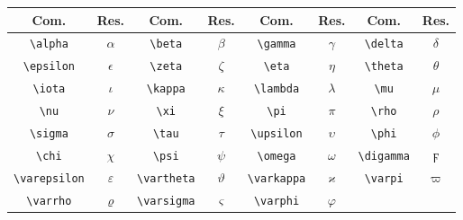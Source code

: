 % 
% 
% 
% 
% 
\begin{tabular}{cc|cc|cc|cc}
    \hline
    Com. & Res. & Com. & Res. & Com. & Res. & Com. & Res. \\ \hline
    \lstinline!\alpha! & $\alpha$ & \lstinline!\beta! & $\beta$ & \lstinline!\gamma! & $\gamma$ & \lstinline!\delta! & $\delta$ \\
    \lstinline!\epsilon! & $\epsilon$ & \lstinline!\zeta! & $\zeta$ & \lstinline!\eta! & $\eta$ & \lstinline!\theta! & $\theta$ \\
    \lstinline!\iota! & $\iota$ & \lstinline!\kappa! & $\kappa$ & \lstinline!\lambda! & $\lambda$ & \lstinline!\mu! & $\mu$ \\
    \lstinline!\nu! & $\nu$ & \lstinline!\xi! & $\xi$ & \lstinline!\pi! & $\pi$ & \lstinline!\rho! & $\rho$ \\
    \lstinline!\sigma! & $\sigma$ & \lstinline!\tau! & $\tau$ & \lstinline!\upsilon! & $\upsilon$ & \lstinline!\phi! & $\phi$ \\
    \lstinline!\chi! & $\chi$ & \lstinline!\psi! & $\psi$ & \lstinline!\omega! & $\omega$ & \lstinline!\digamma! & $\digamma$ \\
    \lstinline!\varepsilon! & $\varepsilon$ & \lstinline!\vartheta! & $\vartheta$ & \lstinline!\varkappa! & $\varkappa$ & \lstinline!\varpi! & $\varpi$ \\
    \lstinline!\varrho! & $\varrho$ & \lstinline!\varsigma! & $\varsigma$ & \lstinline!\varphi! & $\varphi$ & & \\ \hline
\end{tabular}
